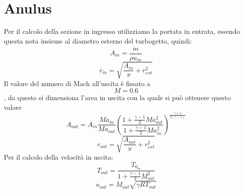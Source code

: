 \section{Anulus} 
Per il calcolo della sezione in ingresso utilizziamo la portata in entrata, essendo questa nota insieme al diametro esterno del turbogetto, quindi:
\begin{equation*}
    A_{in}=\frac{\dot{m}}{\rho u_{in}}
\end{equation*}
\begin{equation*}
    r_{in}= \sqrt{\frac{A_{in}}{\pi} + r_{ext}^2 }
\end{equation*}
Il valore del numero di Mach all'uscita è fissato a \[M=0.6\], da questo si dimensiona l'area in uscita con la quale si può ottenere questo valore
\begin{equation*}
    A_{{out}} = A_{{in}} \frac{Ma_{{in}}}{Ma_{{out}}} ( \frac{1 + \frac{\gamma-1}{2} Ma_{{out}}^2}{1 + \frac{\gamma-1}{2} Ma_{{in}}^2})^{\frac{\gamma+1}{2(\gamma-1)}}
\end{equation*}
\begin{equation*}
    r_{out}= \sqrt{\frac{A_{out}}{\pi} + r_{ext}^2 }
\end{equation*}
Per il calcolo della velocità in uscita:
\begin{equation*}
    T_{out}=\frac{T_{0_{in}}}{1+\frac{\gamma-1}{2}M_{out}^2}
\end{equation*}
\begin{equation*}
    u_{out}=M_{out}\sqrt{\gamma R T_{out}}
\end{equation*}

